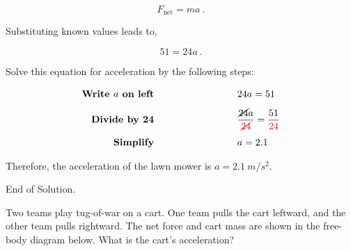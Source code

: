 \documentclass{article}
\begin{document}
\begin{equation*}
    F_{\mathrm{net}} = ma\ .
\end{equation*}

Substituting known values leads to,

\begin{equation*}
    51 = 24 a\ .
\end{equation*}

Solve this equation for acceleration by the following steps:

\begin{align*}
    \textbf{Write $a$ on left} \hspace{9cm} 
    & \hspace{-6cm} 24 a = 51\\[1ex]
    \textbf{Divide by 24} \hspace{9cm}
    & \hspace{-6cm} \frac{\cancel{24}a}{\textcolor{red}{\cancel{24}}} = \frac{51}{\textcolor{red}{24}}\\[1ex]
    \textbf{Simplify} \hspace{9cm}
    & \hspace{-6cm} a = 2.1
\end{align*}

Therefore, the acceleration of the lawn mower is  $a = \SI{2.1}{m/s^2}$.

End of Solution.

\begin{example} \label{ex:TugOWar} 
Two teams play tug-of-war on a cart. One team pulls the cart leftward, and the other team pulls rightward. The net force and cart mass are shown in the free-body diagram below. What is the cart's acceleration?
\end{example}

\begin{center}
\end{center}
\end{document}

